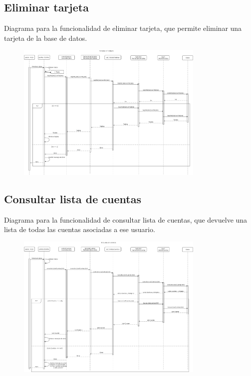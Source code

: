 \documentclass[12pt]{article}
\begin{document}
\subsection{Eliminar tarjeta}
Diagrama para la funcionalidad de eliminar tarjeta, que permite eliminar una tarjeta de la base de datos.
\begin{figure}[H]
    \centering
    \includegraphics[width=0.8\textwidth]{images/15-Gestor_elimina_tarjeta.png}
\end{figure}
\subsection{Consultar lista de cuentas}
Diagrama para la funcionalidad de consultar lista de cuentas, que devuelve una lista de todas las cuentas asociadas a ese usuario.
\begin{figure}[H]
    \centering
    \includegraphics[width=0.8\textwidth]{images/16-cuentaconsultartodos.png}
\end{figure}
\newpage
\end{document}
